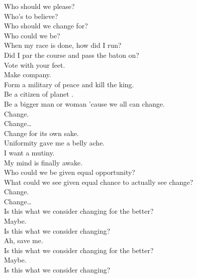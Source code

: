 
\label{album:changes}




Who should we please? \\
Who's to believe? \\
Who should we change for? \\
Who could we be? \\
When my race is done, how did I run? \\
Did I par the course and pass the baton on? \\

Vote with your feet. \\
Make company. \\
Form a military of peace and kill the king. \\
Be a citizen of planet . \\
Be a bigger man or woman 'cause we all can change. \\

Change. \\
Change… \\

Change for its own sake. \\
Uniformity gave me a belly ache. \\
I want a mutiny. \\
My mind is finally awake. \\
Who could we be given equal opportunity? \\
What could we see given equal chance to actually see change? \\

Change. \\
Change… \\

Is this what we consider changing for the better? \\
Maybe. \\

Is this what we consider changing? \\
Ah, save me. \\
Is this what we consider changing for the better? \\
Maybe. \\
Is this what we consider changing? \\


